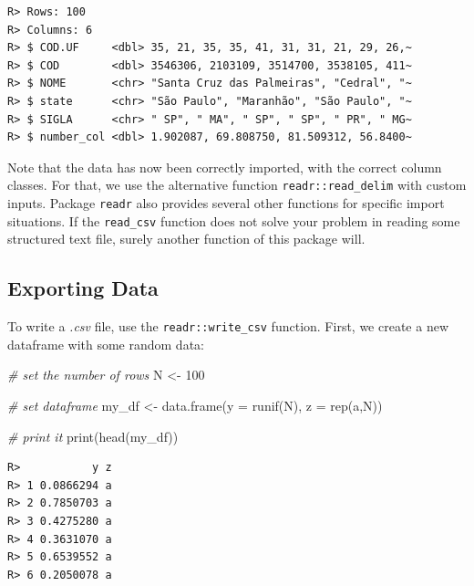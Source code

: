 \documentclass[
  12pt,
]{book}
\newenvironment{Shaded}{\begin{snugshade}}{\end{snugshade}}
\newcommand{\AttributeTok}[1]{\textcolor[rgb]{0.61,0.61,0.61}{#1}}
\newcommand{\CommentTok}[1]{\textcolor[rgb]{0.37,0.37,0.37}{\textit{#1}}}
\newcommand{\DecValTok}[1]{\textcolor[rgb]{0.06,0.06,0.06}{#1}}
\newcommand{\FunctionTok}[1]{\textcolor[rgb]{0,0,0}{#1}}
\newcommand{\NormalTok}[1]{#1}
\newcommand{\OtherTok}[1]{\textcolor[rgb]{0.37,0.37,0.37}{#1}}
\newcommand{\StringTok}[1]{\textcolor[rgb]{0.5,0.5,0.5}{#1}}
\begin{document}
\begin{verbatim}
R> Rows: 100
R> Columns: 6
R> $ COD.UF     <dbl> 35, 21, 35, 35, 41, 31, 31, 21, 29, 26,~
R> $ COD        <dbl> 3546306, 2103109, 3514700, 3538105, 411~
R> $ NOME       <chr> "Santa Cruz das Palmeiras", "Cedral", "~
R> $ state      <chr> "São Paulo", "Maranhão", "São Paulo", "~
R> $ SIGLA      <chr> " SP", " MA", " SP", " SP", " PR", " MG~
R> $ number_col <dbl> 1.902087, 69.808750, 81.509312, 56.8400~
\end{verbatim}

Note that the data has now been correctly imported, with the correct column classes. For that, we use the alternative function \texttt{readr::read\_delim} with custom inputs. Package \texttt{readr} also provides several other functions for specific import situations. If the \texttt{read\_csv} function does not solve your problem in reading some structured text file, surely another function of this package will.

\hypertarget{exporting-data}{%
\subsection{Exporting Data}\label{exporting-data}}

To write a \emph{.csv} file, use the \texttt{readr::write\_csv} function. First, we create a new dataframe with some random data:  

\begin{Shaded}
\begin{Highlighting}[]
\CommentTok{\# set the number of rows}
\NormalTok{N }\OtherTok{\textless{}{-}} \DecValTok{100}

\CommentTok{\# set dataframe}
\NormalTok{my\_df }\OtherTok{\textless{}{-}} \FunctionTok{data.frame}\NormalTok{(}\AttributeTok{y =} \FunctionTok{runif}\NormalTok{(N), }
                    \AttributeTok{z =} \FunctionTok{rep}\NormalTok{(}\StringTok{\textquotesingle{}a\textquotesingle{}}\NormalTok{,N))}

\CommentTok{\# print it}
\FunctionTok{print}\NormalTok{(}\FunctionTok{head}\NormalTok{(my\_df))}
\end{Highlighting}
\end{Shaded}

\begin{verbatim}
R>           y z
R> 1 0.0866294 a
R> 2 0.7850703 a
R> 3 0.4275280 a
R> 4 0.3631070 a
R> 5 0.6539552 a
R> 6 0.2050078 a
\end{verbatim}
\end{document}
